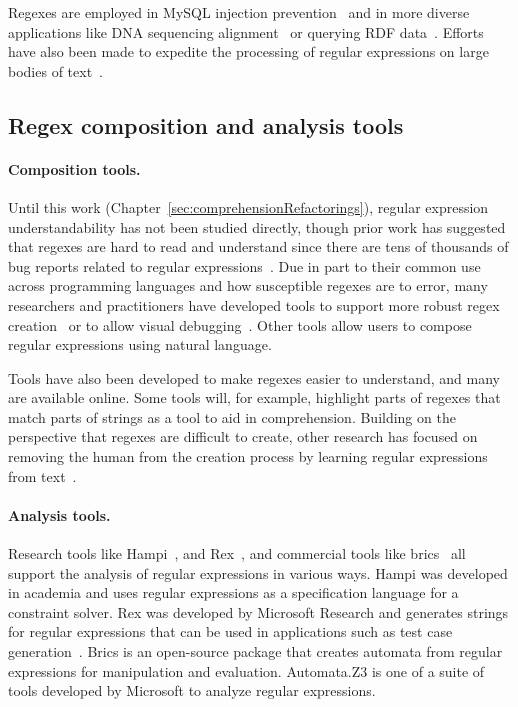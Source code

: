 Regexes are employed in MySQL injection prevention~ and in more diverse applications like DNA sequencing alignment~ or querying RDF data~.  Efforts have also been made to expedite the processing of regular expressions on large bodies of text~.

\subsection{Regex composition and analysis tools}
\paragraph{Composition tools.} Until this work (Chapter~\ref{sec:comprehensionRefactorings}), regular expression understandability has not been studied directly, though prior work has suggested that regexes are hard to read and understand since there are tens of thousands of bug reports related to regular expressions~.  Due in part to their common use across programming languages and how susceptible regexes are to error, many researchers and practitioners have developed tools to support more robust regex creation~ or to allow visual debugging~.  Other tools allow users to compose regular expressions using natural language.

Tools have also been developed to make regexes easier to understand, and many are available online. Some tools will, for example, highlight parts of regexes that match parts of strings as a tool to aid in comprehension.  Building on the perspective that regexes are difficult to create, other research has focused on removing the human from the creation process by learning regular expressions from  text~.

\paragraph{Analysis tools.} Research tools like Hampi~, and Rex~, and commercial tools like brics~ all support the analysis of regular expressions in various ways. Hampi was developed  in academia and uses regular expressions as a specification language for a constraint solver. Rex was developed by Microsoft Research and generates strings for regular expressions that can be used in  applications such as test case generation~. Brics is an open-source package that creates automata from regular expressions for manipulation and evaluation. Automata.Z3 is one of a suite of tools developed by Microsoft to analyze regular expressions.
